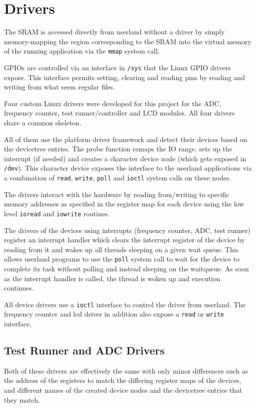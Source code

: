 \newpage
\section{Drivers}
The SRAM is accessed directly from userland without a driver by simply memory-mapping the
region corresponding to the SRAM into the virtual memory of the running application via the
\texttt{mmap} system call.

GPIOs are controlled via an interface in \texttt{/sys} that the Linux GPIO drivers expose. This
interface permits setting, clearing and reading pins by reading and writing from what seem
regular files.

Four custom Linux drivers were developed for this project for the ADC, frequency counter, test
runner/controller and LCD modules. All four drivers share a common skeleton.

All of them use the platform driver framework and detect their devices based on the devicetree
entries. The probe function remaps the IO range, sets up the interrupt (if needed) and
creates a character device node (which gets exposed in \texttt{/dev}). This character device
exposes the interface to the userland applications via a combination of \texttt{read},
\texttt{write}, \texttt{poll} and \texttt{ioctl} system calls on these nodes.

The drivers interact with the hardware by reading from/writing to specific memory addresses
as specified in the register map for each device using the low level \texttt{ioread} and
\texttt{iowrite} routines.

The drivers of the devices using interrupts (frequency counter, ADC, test runner) register
an interrupt handler which clears the interrupt register of the device by reading from it
and wakes up all threads sleeping on a given wait queue. This allows userland programs
to use the \texttt{poll} system call to wait for the device to complete its task without
polling and instead sleeping on the waitqueue. As soon as the interrupt handler is called,
the thread is woken up and execution continues.

All device drivers use a \texttt{ioctl} interface to control the driver from userland.
The frequency counter and lcd driver in addition also expose a \texttt{read} or \texttt{write}
interface.

\subsection{Test Runner and ADC Drivers}
Both of these drivers are effectively the same with only minor differences such as the
address of the registers to match the differing register maps of the devices, and different
names of the created device nodes and the devicetree entries that they match.

